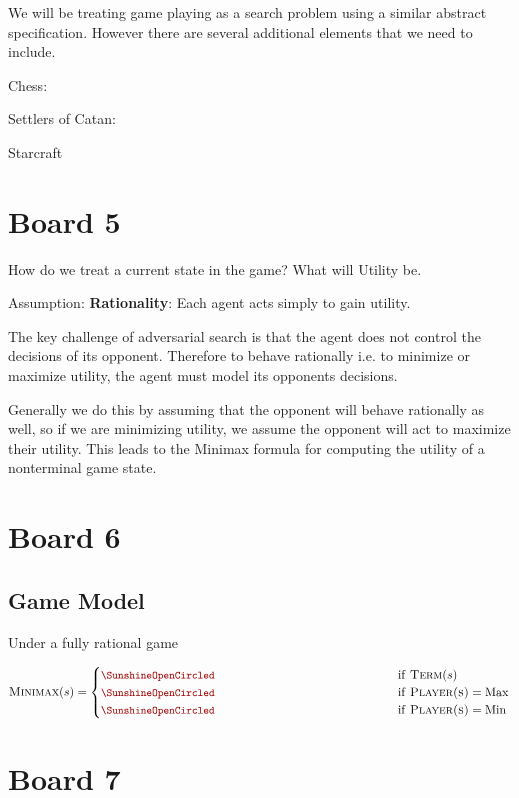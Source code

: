 \documentclass[11pt]{article}
\begin{document}
We will be treating game playing as a search problem using a similar abstract specification. However there are several additional elements that we need to include.

Chess:

Settlers of Catan: 

Starcraft

\section{Board 5}

How do we treat a current state in the game? What will Utility be. 


Assumption:  \textbf{Rationality}: Each agent acts simply to gain utility. 


The key challenge of adversarial search is that the agent does not control the decisions of its opponent. Therefore to behave rationally i.e. to minimize or maximize utility, the agent must model its opponents decisions. 

Generally we do this by assuming that the opponent will behave rationally as well, so if we are minimizing utility, we assume the opponent will act to maximize their utility. This leads to the Minimax formula for computing the utility of a nonterminal game state.

\section{Board 6}

\subsection{Game Model}

Under a fully rational game 

\[ \msc{Minimax}(s) = \begin{cases} 
  \censorm{\msc{Utility}(s)} & \mathrm{if\ } \msc{Term}(s)  \\
  \censorm{\max_{a \in \msc{Act}(s)}  \msc{Minimax}(\msc{Res}(s, a))} & \mathrm{if\ } \msc{Player(s)} = \mathrm{Max}  \\
  \censorm{\min_{a \in \msc{Act}(s) } \msc{Minimax}(\msc{Res}(s, a))} & \mathrm{if\ } \msc{Player(s)} = \mathrm{Min} 

\end{cases}\] 

\section{Board 7}
\end{document}
